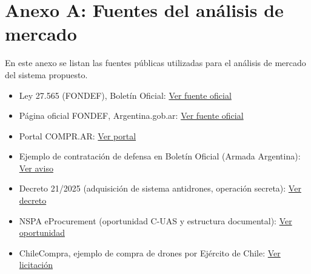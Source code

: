 \chapter{Anexo A: Fuentes del análisis de mercado}

\label{AppendixA}

En este anexo se listan las fuentes públicas utilizadas para el análisis de mercado del sistema propuesto.

\begin{itemize}
    \item Ley 27.565 (FONDEF), Boletín Oficial: \href{https://www.boletinoficial.gob.ar/detalleAviso/primera/235602/20201001}{Ver fuente oficial}
    \item Página oficial FONDEF, Argentina.gob.ar: \href{https://www.argentina.gob.ar/defensa/fondo-nacional-de-la-defensa-fondef}{Ver fuente oficial}
    \item Portal COMPR.AR: \href{https://comprar.gob.ar/}{Ver portal}
    \item Ejemplo de contratación de defensa en Boletín Oficial (Armada Argentina): \href{https://www.boletinoficial.gob.ar/detalleAviso/tercera/2405403/20251210}{Ver aviso}
    \item Decreto 21/2025 (adquisición de sistema antidrones, operación secreta): \href{https://www.boletinoficial.gob.ar/detalleAviso/primera/319500/20250113}{Ver decreto}
    \item NSPA eProcurement (oportunidad C-UAS y estructura documental): \href{https://eportal.nspa.nato.int/eProcurement5G/Opportunities/Opportunities/RequestForProposalDetails/piTFTh8PiEAou5b7PociWA}{Ver oportunidad}
    \item ChileCompra, ejemplo de compra de drones por Ejército de Chile: \href{https://www.mercadopublico.cl/Procurement/Modules/RFB/DetailsAcquisition.aspx?idlicitacion=3385-5-L124}{Ver licitación}
\end{itemize}
